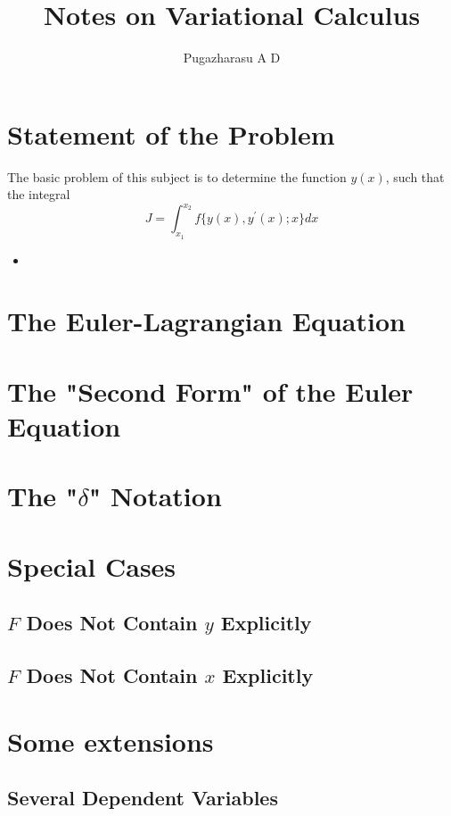 \documentclass[]{article}
\title{Notes on Variational Calculus}
\author{Pugazharasu A D}
\begin{document}
\maketitle

\begin{abstract}

\end{abstract}

\section{Statement of the Problem}
The basic problem of this subject is to determine the function $y(x)$, such that the integral
\begin{equation}
J = \int_{x_{1}}^{x_{2}} f\{ y(x),y^{'}(x);x\} dx
\end{equation}
\begin{itemize}
\item 
\end{itemize}
\section{The Euler-Lagrangian Equation}

\section{The "Second Form" of the Euler Equation}

\section{The "$\delta$" Notation}

\section{Special Cases}
\subsection{$F$ Does Not Contain $y$ Explicitly}
\subsection{$F$ Does Not Contain $x$ Explicitly}
\section{Some extensions}
\subsection{Several Dependent Variables}
\end{document}

